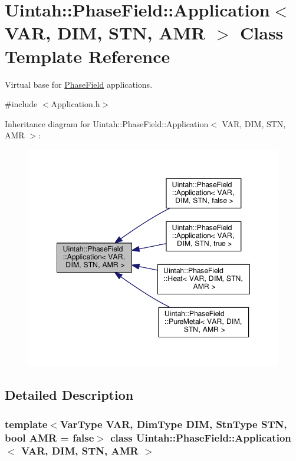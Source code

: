 \hypertarget{classUintah_1_1PhaseField_1_1Application}{}\section{Uintah\+:\+:Phase\+Field\+:\+:Application$<$ V\+AR, D\+IM, S\+TN, A\+MR $>$ Class Template Reference}
\label{classUintah_1_1PhaseField_1_1Application}


Virtual base for \hyperlink{namespaceUintah_1_1PhaseField}{Phase\+Field} applications.  




{\ttfamily \#include $<$Application.\+h$>$}



Inheritance diagram for Uintah\+:\+:Phase\+Field\+:\+:Application$<$ V\+AR, D\+IM, S\+TN, A\+MR $>$\+:\nopagebreak
\begin{figure}[H]
\begin{center}
\leavevmode
\includegraphics[width=348pt]{classUintah_1_1PhaseField_1_1Application__inherit__graph}
\end{center}
\end{figure}


\subsection{Detailed Description}
\subsubsection*{template$<$Var\+Type V\+AR, Dim\+Type D\+IM, Stn\+Type S\+TN, bool A\+MR = false$>$\newline
class Uintah\+::\+Phase\+Field\+::\+Application$<$ V\+A\+R, D\+I\+M, S\+T\+N, A\+M\+R $>$}

